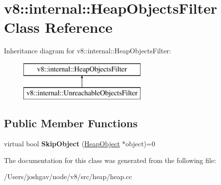 \hypertarget{classv8_1_1internal_1_1_heap_objects_filter}{}\section{v8\+:\+:internal\+:\+:Heap\+Objects\+Filter Class Reference}
\label{classv8_1_1internal_1_1_heap_objects_filter}
Inheritance diagram for v8\+:\+:internal\+:\+:Heap\+Objects\+Filter\+:\begin{figure}[H]
\begin{center}
\leavevmode
\includegraphics[height=2.000000cm]{classv8_1_1internal_1_1_heap_objects_filter}
\end{center}
\end{figure}
\subsection*{Public Member Functions}
\begin{DoxyCompactItemize}
\item 
virtual bool {\bfseries Skip\+Object} (\hyperlink{classv8_1_1internal_1_1_heap_object}{Heap\+Object} $\ast$object)=0\hypertarget{classv8_1_1internal_1_1_heap_objects_filter_a2f489bb60d2feecea91c232fc8fd23c9}{}\label{classv8_1_1internal_1_1_heap_objects_filter_a2f489bb60d2feecea91c232fc8fd23c9}

\end{DoxyCompactItemize}


The documentation for this class was generated from the following file\+:\begin{DoxyCompactItemize}
\item 
/\+Users/joshgav/node/v8/src/heap/heap.\+cc\end{DoxyCompactItemize}
